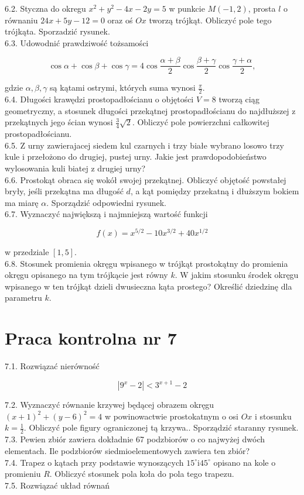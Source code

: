 \documentclass[10pt]{article}
\begin{document}
6.2. Styczna do okregu $x^{2}+y^{2}-4 x-2 y=5$ w punkcie $M(-1,2)$, prosta $l$ o równaniu $24 x+5 y-12=0$ oraz oś $O x$ tworzą trójkąt. Obliczyć pole tego trójkąta. Sporzadzić rysunek.\\
6.3. Udowodnić prawdziwość tożsamości

$$
\cos \alpha+\cos \beta+\cos \gamma=4 \cos \frac{\alpha+\beta}{2} \cos \frac{\beta+\gamma}{2} \cos \frac{\gamma+\alpha}{2},
$$

gdzie $\alpha, \beta, \gamma$ są kątami ostrymi, których suma wynosi $\frac{\pi}{2}$.\\
6.4. Długości krawędzi prostopadłościanu o objętości $V=8$ tworzą ciąg geometryczny, a stosunek długości przekątnej prostopadłościanu do najdłuższej z przekątnych jego ścian wynosi $\frac{3}{4} \sqrt{2}$. Obliczyć pole powierzchni całkowitej prostopadłościanu.\\
6.5. Z urny zawierajacej siedem kul czarnych i trzy białe wybrano losowo trzy kule i przełożono do drugiej, pustej urny. Jakie jest prawdopodobieństwo wylosowania kuli biatej z drugiej urny?\\
6.6. Prostokąt obraca się wokół swojej przekątnej. Obliczyć objętość powstałej bryły, jeśli przekątna ma długość $d$, a kąt pomiędzy przekatną i dłuższym bokiem ma miarę $\alpha$. Sporządzić odpowiedni rysunek.\\
6.7. Wyznaczyć największą i najmniejszą wartość funkcji

$$
f(x)=x^{5 / 2}-10 x^{3 / 2}+40 x^{1 / 2}
$$

w przedziale $[1,5]$.\\
6.8. Stosunek promienia okręgu wpisanego w trójkąt prostokątny do promienia okręgu opisanego na tym trójkącie jest równy $k$. W jakim stosunku środek okręgu wpisanego w ten trójkąt dzieli dwusieczna kąta prostego? Określić dziedzinę dla parametru $k$.

\section*{Praca kontrolna nr 7}
7.1. Rozwiązać nierówność

$$
\left|9^{x}-2\right|<3^{x+1}-2
$$

7.2. Wyznaczyć równanie krzywej będącej obrazem okręgu $(x+1)^{2}+(y-6)^{2}=4$ w powinowactwie prostokatnym o osi $O x$ i stosunku $k=\frac{1}{2}$. Obliczyć pole figury ograniczonej tą krzywa.. Sporządzić staranny rysunek.\\
7.3. Pewien zbiór zawiera dokładnie 67 podzbiorów o co najwyżej dwóch elementach. Ile podzbiorów siedmioelementowych zawiera ten zbiór?\\
7.4. Trapez o kątach przy podstawie wynoszących $15^{\circ} \mathrm{i} 45^{\circ}$ opisano na kole o promieniu $R$. Obliczyć stosunek pola koła do pola tego trapezu.\\
7.5. Rozwiązać układ równań
\end{document}

